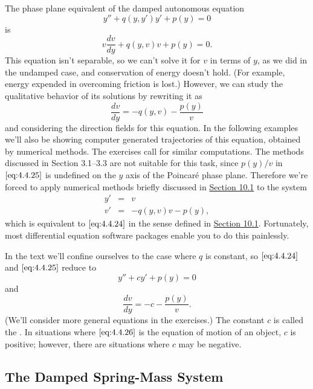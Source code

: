 \documentclass{ximera}
\begin{document}
The phase plane equivalent of the damped autonomous equation
\begin{equation}\label{eq:4.4.24}
y''+q(y,y')y'+p(y)=0
\end{equation}
is
$$
v\frac{dv}{dy}+q(y,v)v+p(y)=0.
$$
This equation isn't  separable, so we can't solve it for $v$ in terms
of
$y$,
as we did in the undamped case, and conservation of energy doesn't
hold. (For example, energy expended in overcoming friction is lost.)
However, we can study the qualitative behavior of its solutions by
rewriting it as
\begin{equation}\label{eq:4.4.25}
\frac{dv}{dy}=-q(y,v)-\frac{p(y)}{v}
\end{equation}
and considering the direction fields for this equation. In the
following examples we'll also be showing computer generated
trajectories of this equation, obtained by numerical methods. The
exercises call for similar computations. 
The methods discussed in
Section 3.1--3.3 are not suitable for this
task, since  $p(y)/v$ in $\eqref{eq:4.4.25}$ is undefined on the $y$ axis
of the Poincar\'e phase plane. Therefore we're forced to apply
numerical methods briefly discussed in
\href{https://xerxes.ximera.org/differentialequations/main/introToSystems/introToSystems}{Section 10.1} to the
system
\begin{eqnarray*}
y'&=&v\\
v'&=&-q(y,v)v-p(y),
\end{eqnarray*}
which is equivalent to $\eqref{eq:4.4.24}$ 
in the sense defined in \href{https://xerxes.ximera.org/differentialequations/main/introToSystems/introToSystems}{Section 10.1}. 
Fortunately, most differential equation software
packages  enable you to do this painlessly.
 
In the text we'll confine ourselves to the case where $q$
is constant, so $\eqref{eq:4.4.24}$ and $\eqref{eq:4.4.25}$  reduce to
\begin{equation}\label{eq:4.4.26}
y''+cy'+p(y)=0
\end{equation}
and
$$
\frac{dv}{dy}=-c-\frac{p(y)}{v}.
$$
(We'll consider more general equations in the exercises.) The constant
$c$ is called the . In situations where
$\eqref{eq:4.4.26}$ is the equation of motion of an object, $c$ is positive;
however, there are situations where  $c$ may be negative.
 
\subsection*{The Damped Spring-Mass System}
 
\end{document}
